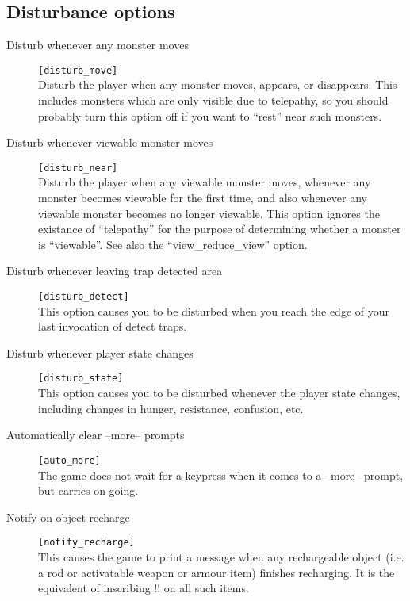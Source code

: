 \subsection{Disturbance options}
\begin{description}
\item[Disturb whenever any monster moves] \verb+[disturb_move]+\\
    Disturb the player when any monster moves, appears, or disappears.
    This includes monsters which are only visible due to telepathy, so
    you should probably turn this option off if you want to ``rest'' near
    such monsters.

\item[Disturb whenever viewable monster moves] \verb+[disturb_near]+\\
    Disturb the player when any viewable monster moves, whenever any
    monster becomes viewable for the first time, and also whenever any
    viewable monster becomes no longer viewable. This option ignores
    the existance of ``telepathy'' for the purpose of determining whether
    a monster is ``viewable''. See also the ``view\_reduce\_view'' option.

\item[Disturb whenever leaving trap detected area]
\verb+[disturb_detect]+\\
    This option causes you to be disturbed when you reach the edge of your
    last invocation of detect traps.

\item[Disturb whenever player state changes] \verb+[disturb_state]+\\
    This option causes you to be disturbed whenever the player state
    changes, including changes in hunger, resistance, confusion, etc.

\item[Automatically clear --more-- prompts] \verb+[auto_more]+\\
    The game does not wait for a keypress when it comes to a --more--
    prompt, but carries on going.

\item[Notify on object recharge] \verb+[notify_recharge]+\\
    This causes the game to print a message when any rechargeable object
    (i.e. a rod or activatable weapon or armour item) finishes recharging.
    It is the equivalent of inscribing {!!} on all such items.
\end{description}


